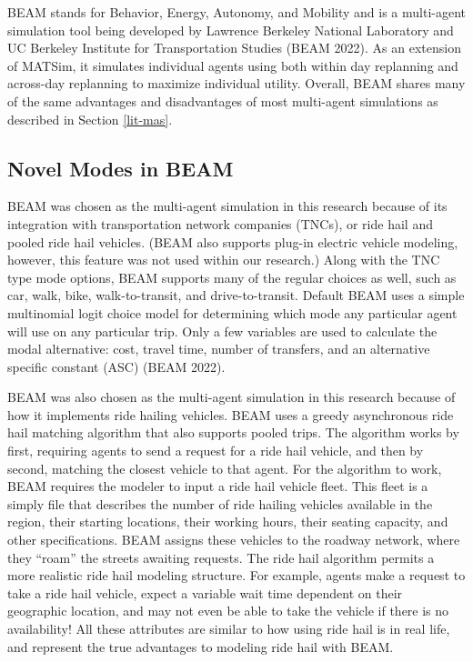 \documentclass[12pt, oneside, openright]{byuthesis}
\begin{document}
BEAM stands for Behavior, Energy, Autonomy, and Mobility and is a multi-agent simulation tool being developed by Lawrence Berkeley National Laboratory and UC Berkeley Institute for Transportation Studies (BEAM 2022). As an extension of MATSim, it simulates individual agents using both within day replanning and across-day replanning to maximize individual utility. Overall, BEAM shares many of the same advantages and disadvantages of most multi-agent simulations as described in Section \ref{lit-mas}.

\hypertarget{novel-modes-in-beam}{%
\subsection{Novel Modes in BEAM}\label{novel-modes-in-beam}}

BEAM was chosen as the multi-agent simulation in this research because of its integration with transportation network companies (TNCs), or ride hail and pooled ride hail vehicles. (BEAM also supports plug-in electric vehicle modeling, however, this feature was not used within our research.) Along with the TNC type mode options, BEAM supports many of the regular choices as well, such as car, walk, bike, walk-to-transit, and drive-to-transit. Default BEAM uses a simple multinomial logit choice model for determining which mode any particular agent will use on any particular trip. Only a few variables are used to calculate the modal alternative: cost, travel time, number of transfers, and an alternative specific constant (ASC) (BEAM 2022).

BEAM was also chosen as the multi-agent simulation in this research because of how it implements ride hailing vehicles. BEAM uses a greedy asynchronous ride hail matching algorithm that also supports pooled trips. The algorithm works by first, requiring agents to send a request for a ride hail vehicle, and then by second, matching the closest vehicle to that agent. For the algorithm to work, BEAM requires the modeler to input a ride hail vehicle fleet. This fleet is a simply file that describes the number of ride hailing vehicles available in the region, their starting locations, their working hours, their seating capacity, and other specifications. BEAM assigns these vehicles to the roadway network, where they ``roam'' the streets awaiting requests. The ride hail algorithm permits a more realistic ride hail modeling structure. For example, agents make a request to take a ride hail vehicle, expect a variable wait time dependent on their geographic location, and may not even be able to take the vehicle if there is no availability! All these attributes are similar to how using ride hail is in real life, and represent the true advantages to modeling ride hail with BEAM.
\end{document}
